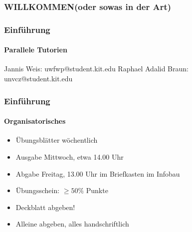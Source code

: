 \documentclass{beamer}
\begin{document}
	\begin{frame}
		\frametitle{WILLKOMMEN(oder sowas in der Art)}
	\end{frame}
	\begin{frame}
		\frametitle{Einführung}
		\framesubtitle{Parallele Tutorien}
		Jannis Weis: uwfwp@student.kit.edu
		Raphael Adalid Braun: unvcz@student.kit.edu
	\end{frame}
	\begin{frame}
		\frametitle{Einführung}
		\framesubtitle{Organisatorisches}
		\begin{itemize}
			\item Übungsblätter wöchentlich
			\item Ausgabe Mittwoch, etwa 14.00 Uhr
			\item Abgabe Freitag, 13.00 Uhr im Briefkasten im Infobau
			\item Übungsschein: $\geq50\%$ Punkte
			\item Deckblatt abgeben!
			\item Alleine abgeben, alles handschriftlich
		\end{itemize}
	\end{frame}
\end{document}
